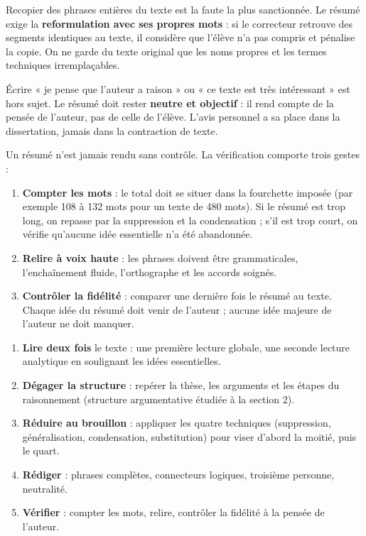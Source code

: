 \documentclass[11pt]{article}
\newcounter{popsec}
\newcounter{popsub}
\newcommand{\courssub}[1]{%
  \stepcounter{popsub}%
  \par\vspace{9pt}\noindent{\popxbold\fontsize{11.5}{13}\selectfont\color{popink}{\color{poporange}\thepopsec.\thepopsub}\hspace{6pt}#1}\par\nopagebreak\vspace{4pt}
}
\begin{document}
\begin{attention}
Recopier des phrases entières du texte est la faute la plus sanctionnée. Le résumé exige la \textbf{reformulation avec ses propres mots} : si le correcteur retrouve des segments identiques au texte, il considère que l'élève n'a pas compris et pénalise la copie. On ne garde du texte original que les noms propres et les termes techniques irremplaçables.
\end{attention}

\begin{attention}
Écrire « je pense que l'auteur a raison » ou « ce texte est très intéressant » est hors sujet. Le résumé doit rester \textbf{neutre et objectif} : il rend compte de la pensée de l'auteur, pas de celle de l'élève. L'avis personnel a sa place dans la dissertation, jamais dans la contraction de texte.
\end{attention}

\courssub{La vérification finale}

Un résumé n'est jamais rendu sans contrôle. La vérification comporte trois gestes :

\begin{enumerate}
\item \textbf{Compter les mots} : le total doit se situer dans la fourchette imposée (par exemple 108 à 132 mots pour un texte de 480 mots). Si le résumé est trop long, on repasse par la suppression et la condensation ; s'il est trop court, on vérifie qu'aucune idée essentielle n'a été abandonnée.
\item \textbf{Relire à voix haute} : les phrases doivent être grammaticales, l'enchaînement fluide, l'orthographe et les accords soignés.
\item \textbf{Contrôler la fidélité} : comparer une dernière fois le résumé au texte. Chaque idée du résumé doit venir de l'auteur ; aucune idée majeure de l'auteur ne doit manquer.
\end{enumerate}

\begin{methode}
\begin{enumerate}
\item \textbf{Lire deux fois} le texte : une première lecture globale, une seconde lecture analytique en soulignant les idées essentielles.
\item \textbf{Dégager la structure} : repérer la thèse, les arguments et les étapes du raisonnement (structure argumentative étudiée à la section 2).
\item \textbf{Réduire au brouillon} : appliquer les quatre techniques (suppression, généralisation, condensation, substitution) pour viser d'abord la moitié, puis le quart.
\item \textbf{Rédiger} : phrases complètes, connecteurs logiques, troisième personne, neutralité.
\item \textbf{Vérifier} : compter les mots, relire, contrôler la fidélité à la pensée de l'auteur.
\end{enumerate}
\end{methode}
\end{document}

